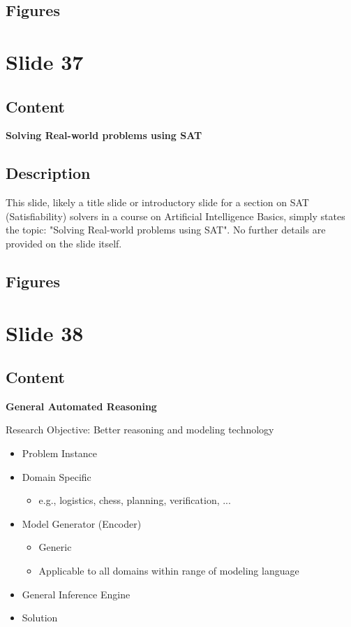 \documentclass{article}%
\begin{document}
\subsection{Figures}%
\begin{figure}[H]%
\centering%
\end{figure}

%
\newpage%
\section{Slide 37}%
\label{sec:Slide37}%
\subsection{Content}%

\textbf{Solving Real-world problems using SAT}
%
\subsection{Description}%
This slide, likely a title slide or introductory slide for a section on SAT (Satisfiability) solvers in a course on Artificial Intelligence Basics, simply states the topic: "Solving Real-world problems using SAT".  No further details are provided on the slide itself.%
\subsection{Figures}%
\begin{figure}[H]%
\centering%
\end{figure}

%
\newpage%
\section{Slide 38}%
\label{sec:Slide38}%
\subsection{Content}%

\textbf{General Automated Reasoning}

Research Objective: Better reasoning and modeling technology

\begin{itemize}
    \item Problem Instance
    \item Domain Specific
        \begin{itemize}
            \item e.g., logistics, chess, planning, verification, ...
        \end{itemize}
    \item Model Generator (Encoder)
        \begin{itemize}
            \item Generic
            \item Applicable to all domains within range of modeling language
        \end{itemize}
    \item General Inference Engine
    \item Solution
\end{itemize}
\end{document}
